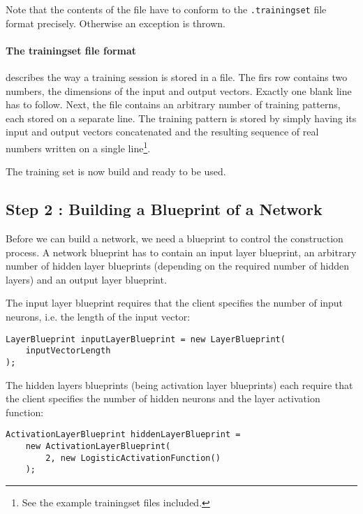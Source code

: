 \medskip

Note that the contents of the file have to conform to the \texttt{.trainingset} file format precisely. Otherwise an exception is thrown.

\paragraph{The \textbf{trainingset} file format} describes the way a training session is stored in a file. The firs row contains two numbers, the dimensions of the input and output vectors. Exactly one blank line has to follow. Next, the file contains an arbitrary number of training patterns, each stored on a separate line. The training pattern is stored by simply having its input and output vectors concatenated and the resulting sequence of real numbers written on a single line\footnote{See the example trainingset files included.}.

The training set is now build and ready to be used.

\subsection{Step 2 : Building a Blueprint of a Network}

Before we can build a network, we need a blueprint to control the construction process. A network blueprint has to contain an input layer blueprint, an arbitrary number of hidden layer blueprints (depending on the required number of hidden layers) and an output layer blueprint.

The input layer blueprint requires that the client specifies the number of input neurons, i.e. the length of the input vector:

\medskip

\begin{verbatim}
LayerBlueprint inputLayerBlueprint = new LayerBlueprint(
    inputVectorLength
);
\end{verbatim}

\medskip  
  
The hidden layers blueprints (being activation layer blueprints) each require that the client specifies the number of hidden neurons and the layer activation function:

\medskip

\begin{verbatim}
ActivationLayerBlueprint hiddenLayerBlueprint =
    new ActivationLayerBlueprint(
        2, new LogisticActivationFunction()
    );
\end{verbatim}

